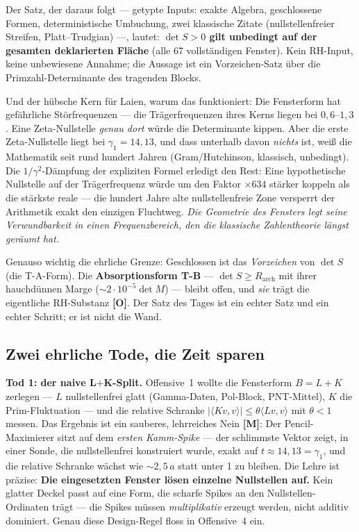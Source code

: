 \documentclass[11pt,a4paper]{article}
\newcommand{\OO}{\textcolor{offen}{\textbf{[O]}}}
\newcommand{\M}{\textcolor{mess}{\textbf{[M]}}}
\begin{document}
Der Satz, der daraus folgt --- getypte Inputs: exakte Algebra,
geschlossene Formen, deterministische Umbuchung, zwei klassische
Zitate (nullstellenfreier Streifen, Platt--Trudgian) ---, lautet:
\textbf{$\det S > 0$ gilt unbedingt auf der gesamten deklarierten
Fläche} (alle 67 vollständigen Fenster). Kein RH-Input, keine
unbewiesene Annahme; die Aussage ist ein Vorzeichen-Satz über die
Primzahl-Determinante des tragenden Blocks.

Und der hübsche Kern für Laien, warum das funktioniert: Die
Fensterform hat \glqq{}gefährliche Störfrequenzen\grqq{} --- die
Trägerfrequenzen ihres Kerns liegen bei $0{,}6$--$1{,}3$. Eine
Zeta-Nullstelle \emph{genau dort} würde die Determinante kippen.
Aber die erste Zeta-Nullstelle liegt bei $\gamma_1 = 14{,}13$, und
dass unterhalb davon \emph{nichts} ist, weiß die Mathematik seit
rund hundert Jahren (Gram/Hutchinson, klassisch, unbedingt). Die
$1/\gamma^2$-Dämpfung der expliziten Formel erledigt den Rest: Eine
hypothetische Nullstelle auf der Trägerfrequenz würde um den Faktor
\textbf{$\times 634$} stärker koppeln als die stärkste reale --- die
hundert Jahre alte nullstellenfreie Zone versperrt der Arithmetik
exakt den einzigen Fluchtweg. \emph{Die Geometrie des Fensters legt
seine Verwundbarkeit in einen Frequenzbereich, den die klassische
Zahlentheorie längst geräumt hat.}

Genauso wichtig die ehrliche Grenze: Geschlossen ist das
\emph{Vorzeichen} von $\det S$ (die T-A-Form). Die
\textbf{Absorptionsform T-B} --- $\det S \ge R_{\mathrm{arch}}$ mit
ihrer hauchdünnen Marge ($\sim 2 \cdot 10^{-5} \det M$) --- bleibt
offen, und \emph{sie} trägt die eigentliche RH-Substanz \OO{}. Der
Satz des Tages ist ein echter Satz und ein echter Schritt; er ist
nicht die Wand.

\subsection*{Zwei ehrliche Tode, die Zeit sparen}

\textbf{Tod 1: der naive L$+$K-Split.} Offensive~1 wollte die
Fensterform $B = L + K$ zerlegen --- $L$ nullstellenfrei glatt
(Gamma-Daten, Pol-Block, PNT-Mittel), $K$ die Prim-Fluktuation ---
und die relative Schranke $|\langle K v, v\rangle| \le \theta
\langle L v, v\rangle$ mit $\theta < 1$ messen. Das Ergebnis ist ein
sauberes, lehrreiches Nein \M{}: Der Pencil-Maximierer sitzt auf dem
\emph{ersten Kamm-Spike} --- der schlimmste Vektor zeigt, in einer
Sonde, die nullstellenfrei konstruiert wurde, exakt auf $t \approx
14{,}13 = \gamma_1$, und die relative Schranke wächst wie
$\sim 2{,}5\,a$ statt unter 1 zu bleiben. Die Lehre ist präzise:
\textbf{Die eingesetzten Fenster lösen einzelne Nullstellen auf.}
Kein glatter Deckel passt auf eine Form, die scharfe Spikes an den
Nullstellen-Ordinaten trägt --- die Spikes müssen
\emph{multiplikativ} erzeugt werden, nicht additiv dominiert. Genau
diese Design-Regel floss in Offensive~4 ein.
\end{document}
